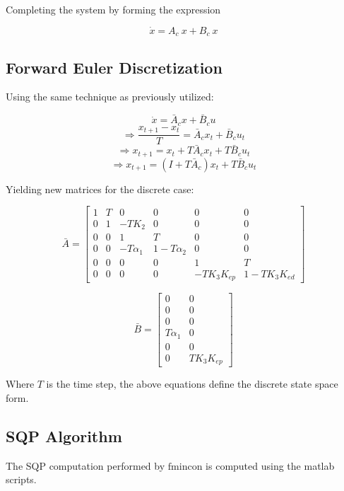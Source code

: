 Completing the system by forming the expression

\begin{equation}
\dot{x} = A_c\ x + B_c\ x
\end{equation}

\subsection{Forward Euler Discretization}

Using the same technique as previously utilized:

$$ \dot{x} = \bar{A}_c x + \bar{B}_c u $$
$$ \Rightarrow \frac{x_{t+1} - x_t}{T} = \bar{A}_c x_t + \bar{B}_c u_t $$
$$ \Rightarrow x_{t+1} = x_t + T\bar{A}_c x_t + T\bar{B}_c u_t $$
$$ \Rightarrow x_{t+1} = (I + T\bar{A}_c) x_t + T\bar{B}_c u_t $$

Yielding new matrices for the discrete case:

\begin{equation}
\bar{A} =
\begin{bmatrix}
    1 & T & 0 & 0 & 0 & 0 \\
    0 & 1 & -TK_2 & 0 & 0 & 0 \\
    0 & 0 & 1 & T & 0 & 0 \\
    0 & 0 & -T\alpha_1 & 1-T\alpha_2 & 0 & 0 \\
    0 & 0 & 0 & 0 & 1 & T \\
    0 & 0 & 0 & 0 & -TK_3K_{ep} & 1-TK_3K_{ed}
\end{bmatrix}
\end{equation}

\begin{equation}
\bar{B} =
\begin{bmatrix}
    0 & 0 \\
    0 & 0 \\
    0 & 0 \\
    T\alpha_1 & 0 \\
    0 & 0 \\
    0 & TK_3K_{ep}
\end{bmatrix}
\end{equation}

Where $T$ is the time step, the above equations define the discrete state space form.

\subsection{SQP Algorithm}
The SQP computation performed by $\mathrm{fmincon}$ is computed using the matlab scripts.




